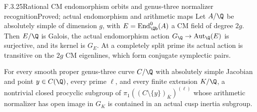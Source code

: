 \begin{result}{F.3.25}{Rational CM endomorphism orbits and genus-three normalizer recognition}{Proved; actual endomorphism and arithmetic maps}
Let $A/\Q$ be absolutely simple of dimension $g$, with
$E=\operatorname{End}^0_{\Qb}(A)$ a CM field of degree $2g$.
Then $E/\Q$ is Galois, the actual endomorphism action
$G_{\Q}\to\operatorname{Aut}_{\Q}(E)$ is surjective, and
its kernel is $G_E$. At a completely split prime its
actual action is transitive on the $2g$ CM eigenlines,
which form conjugate symplectic pairs.

For every smooth proper genus-three curve $C/\Q$ with
absolutely simple Jacobian and point $y\in C(\Q)$,
every prime $\ell$, and every finite extension $K/\Q$,
a nontrivial closed procyclic subgroup of
$\pi_1((C\setminus\{y\})_{\overline K})^{(\ell)}$
whose arithmetic normalizer has open image in $G_K$
is contained in an actual cusp inertia subgroup.
\end{result}
